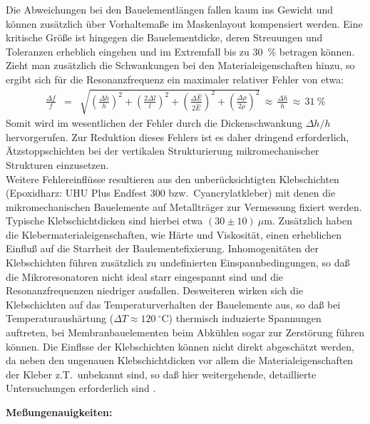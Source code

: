 Die Abweichungen bei den Bauelementlängen fallen kaum ins Gewicht und
können zusätzlich über Vorhaltemaße
im Maskenlayout kompensiert werden. Eine kritische Größe ist hingegen die
Bauelementdicke, deren Streuungen und Toleranzen erheblich eingehen und
im Extremfall bis zu 30~\% betragen können. Zieht man zusätzlich die
Schwankungen bei den Materialeigenschaften hinzu, so ergibt sich für die
Resonanzfrequenz ein maximaler relativer Fehler von etwa:
\begin{eqnarray}
\label{relfehlerfreq}
 \frac{\Delta f}{f} & = & \sqrt{
       {\left( \frac{\Delta h}{h} \right)}^2 +
       {\left( \frac{2\Delta l}{l} \right)}^2 +
       {\left( \frac{\Delta \hat E}{2 \hat E} \right)}^2 +
       {\left( \frac{\Delta \rho}{2 \rho} \right)}^2 }
   \, \approx \, \frac{\Delta h}{h} \, \approx \, 31~\%
\end{eqnarray}
Somit wird im wesentlichen der Fehler durch die Dickenschwankung
$\Delta h/h$ hervorgerufen. Zur Reduktion dieses Fehlers ist es daher
dringend erforderlich, Ätzstoppschichten bei der vertikalen Strukturierung
mikromechanischer Strukturen einzusetzen. \\
%
Weitere Fehlereinflüsse resultieren aus den unberücksichtigten Klebschichten
(Epoxidharz: UHU Plus Endfest 300 bzw.\ Cyancrylatkleber) mit denen die
mikromechanischen Bauelemente auf Metallträger zur Vermessung fixiert werden.
Typische Klebschichtdicken sind hierbei etwa $(30\pm10)~\mu$m. Zusätzlich
haben die Klebermaterialeigenschaften, wie Härte und Viskosität, einen
erheblichen Einfluß auf die Starrheit der Baulementefixierung.
Inhomogenitäten der Klebschichten führen zusätzlich zu undefinierten
Einspannbedingungen, so daß die Mikroresonatoren
nicht ideal starr eingespannt sind und die Resonanzfrequenzen niedriger
ausfallen. Desweiteren wirken sich die Klebschichten auf das
Temperaturverhalten der Bauelemente aus, so daß bei Temperaturaushärtung
($\Delta T \approx 120~^{\circ}$C) thermisch induzierte Spannungen auftreten,
bei Membranbauelementen beim Abkühlen sogar zur Zerstörung führen können.
Die Einflsse der Klebschichten können nicht direkt abgeschätzt werden, da
neben den ungenauen Klebschichtdicken vor allem die Materialeigenschaften
der Kleber z.T.\ unbekannt sind, so daß hier weitergehende, detaillierte
Untersuchungen erforderlich sind \cite{Jauch}.


{\bf Meßungenauigkeiten:}

